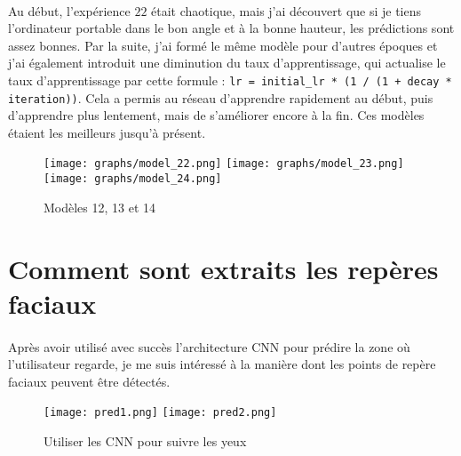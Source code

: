 \paragraph{}
Au début, l'expérience $22$ était chaotique, mais j'ai découvert que si je tiens l'ordinateur portable dans le bon angle et à la bonne hauteur, les prédictions sont assez bonnes.
Par la suite, j'ai formé le même modèle pour d'autres époques et j'ai également introduit une diminution du taux d'apprentissage, qui actualise le taux d'apprentissage par cette formule :
\lstinline{lr = initial_lr * (1 / (1 + decay * iteration))}.
Cela a permis au réseau d'apprendre rapidement au début, puis d'apprendre plus lentement, mais de s'améliorer encore à la fin.
Ces modèles étaient les meilleurs jusqu'à présent.

\begin{figure}[H]
    \centering
    \texttt{[image: graphs/model\_22.png]}
    \texttt{[image: graphs/model\_23.png]}
    \texttt{[image: graphs/model\_24.png]}
    \caption{Modèles 12, 13 et 14}
\end{figure}

\section{Comment sont extraits les repères faciaux}
\paragraph{}
Après avoir utilisé avec succès l'architecture CNN pour prédire la zone où l'utilisateur regarde, je me suis intéressé à la manière dont les points de repère faciaux peuvent être détectés.

\begin{figure}[h]
    \centering
    \texttt{[image: pred1.png]}
    \texttt{[image: pred2.png]}
    \caption{Utiliser les CNN pour suivre les yeux}
\end{figure}

